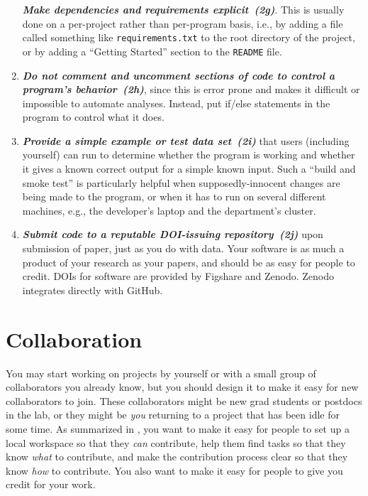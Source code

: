 \documentclass[10pt,letterpaper]{article}
\newcommand{\withurl}[2]{{#1}}
\newcommand{\practicesection}[2]{\section{#1}\label{#2}}
\newcommand{\practice}[2]{\textbf{\emph{{#2}~({#1})}}}
\begin{document}
\begin{enumerate}
  \practice{2g}{Make dependencies and requirements explicit}. This is
  usually done on a per-project rather than per-program basis, i.e.,
  by adding a file called something like \texttt{requirements.txt} to
  the root directory of the project, or by adding a ``Getting
  Started'' section to the \texttt{README} file.

\item

  \practice{2h}{Do not comment and uncomment sections of code to
  control a program's behavior}, since this is error prone and makes
  it difficult or impossible to automate analyses. Instead, put
  if/else statements in the program to control what it does.

\item

  \practice{2i}{Provide a simple example or test data set} that users
  (including yourself) can run to determine whether the program is
  working and whether it gives a known correct output for a simple
  known input. Such a ``build and smoke test'' is particularly helpful
  when supposedly-innocent changes are being made to the program, or
  when it has to run on several different machines, e.g., the
  developer's laptop and the department's cluster.

\item

  \practice{2j}{Submit code to a reputable DOI-issuing repository}
  upon submission of paper, just as you do with data. Your software is
  as much a product of your research as your papers, and should be as
  easy for people to credit. DOIs for software are provided by
  \withurl{Figshare}{https://figshare.com/} and
  \withurl{Zenodo}{https://zenodo.org/}. Zenodo integrates directly
  with GitHub.

\end{enumerate}

\practicesection{Collaboration}{sec:collaboration}

You may start working on projects by yourself or with a small group of
collaborators you already know, but you should design it to make it
easy for new collaborators to join. These collaborators might be new
grad students or postdocs in the lab, or they might be \emph{you}
returning to a project that has been idle for some time. As summarized
in \cite{steinmacher2015}, you want to make it easy for people to set
up a local workspace so that they \emph{can} contribute, help them
find tasks so that they know \emph{what} to contribute, and make the
contribution process clear so that they know \emph{how} to contribute.
You also want to make it easy for people to give you credit for your
work.
\end{document}
